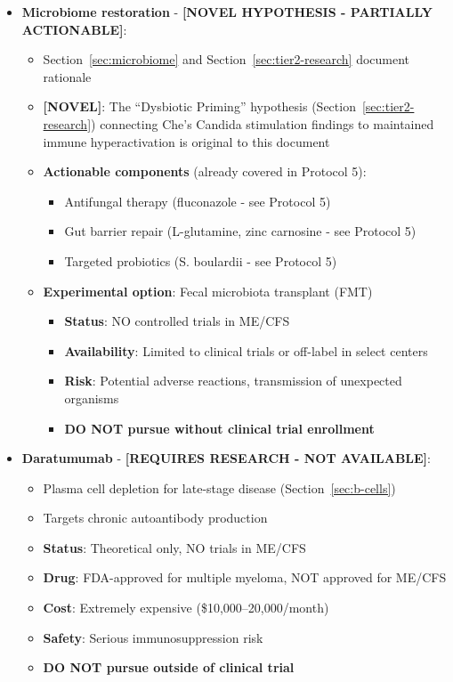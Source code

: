 \begin{itemize}
    \item \textbf{Microbiome restoration} - \textbf{[NOVEL HYPOTHESIS - PARTIALLY ACTIONABLE]}:
    \begin{itemize}
        \item Section~\ref{sec:microbiome} and Section~\ref{sec:tier2-research} document rationale
        \item \textbf{[NOVEL]}: The ``Dysbiotic Priming'' hypothesis (Section~\ref{sec:tier2-research}) connecting Che's Candida stimulation findings to maintained immune hyperactivation is original to this document
        \item \textbf{Actionable components} (already covered in Protocol 5):
        \begin{itemize}
            \item Antifungal therapy (fluconazole - see Protocol 5)
            \item Gut barrier repair (L-glutamine, zinc carnosine - see Protocol 5)
            \item Targeted probiotics (S. boulardii - see Protocol 5)
        \end{itemize}
        \item \textbf{Experimental option}: Fecal microbiota transplant (FMT)
        \begin{itemize}
            \item \textbf{Status}: NO controlled trials in ME/CFS
            \item \textbf{Availability}: Limited to clinical trials or off-label in select centers
            \item \textbf{Risk}: Potential adverse reactions, transmission of unexpected organisms
            \item \textbf{DO NOT pursue without clinical trial enrollment}
        \end{itemize}
    \end{itemize}

    \item \textbf{Daratumumab} - \textbf{[REQUIRES RESEARCH - NOT AVAILABLE]}:
    \begin{itemize}
        \item Plasma cell depletion for late-stage disease (Section~\ref{sec:b-cells})
        \item Targets chronic autoantibody production
        \item \textbf{Status}: Theoretical only, NO trials in ME/CFS
        \item \textbf{Drug}: FDA-approved for multiple myeloma, NOT approved for ME/CFS
        \item \textbf{Cost}: Extremely expensive (\$10,000--20,000/month)
        \item \textbf{Safety}: Serious immunosuppression risk
        \item \textbf{DO NOT pursue outside of clinical trial}
    \end{itemize}


\end{itemize}
